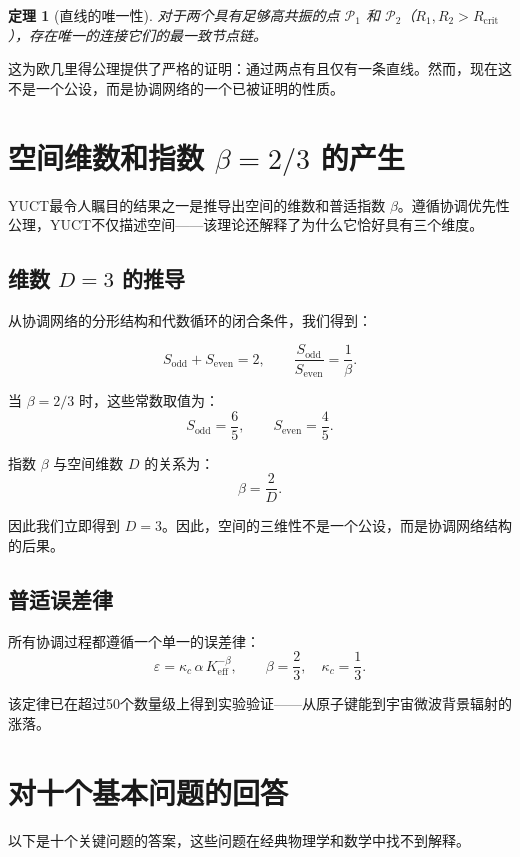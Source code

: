 \documentclass[12pt,a4paper]{article}
\newtheorem{theorem}{定理}
\newcommand{\Keff}{K_{\mathrm{eff}}}
\newcommand{\kappac}{\kappa_c}
\newcommand{\eps}{\varepsilon}
\newcommand{\betaf}{\beta}
\newcommand{\Sodd}{S_{\mathrm{odd}}}
\newcommand{\Seven}{S_{\mathrm{even}}}
\newcommand{\Rcrit}{R_{\mathrm{crit}}}
\newcommand{\calP}{\mathcal{P}}
\begin{document}
	\begin{theorem}[直线的唯一性]
		对于两个具有足够高共振的点 \(\calP_1\) 和 \(\calP_2\)（\(R_1, R_2 > \Rcrit\)），存在唯一的连接它们的最一致节点链。
	\end{theorem}
	
	这为欧几里得公理提供了严格的证明：通过两点有且仅有一条直线。然而，现在这不是一个公设，而是协调网络的一个已被证明的性质。
	
	\section{空间维数和指数 \(\betaf = 2/3\) 的产生}
	
	YUCT最令人瞩目的结果之一是推导出空间的维数和普适指数 \(\betaf\)。遵循协调优先性公理，YUCT不仅描述空间——该理论还解释了为什么它恰好具有三个维度。
	
	\subsection{维数 \(D=3\) 的推导}
	
	从协调网络的分形结构和代数循环的闭合条件，我们得到：
	
	\[
	\Sodd + \Seven = 2, \qquad \frac{\Sodd}{\Seven} = \frac{1}{\betaf}.
	\]
	
	当 \(\betaf = 2/3\) 时，这些常数取值为：
	\[
	\Sodd = \frac{6}{5}, \qquad \Seven = \frac{4}{5}.
	\]
	
	指数 \(\betaf\) 与空间维数 \(D\) 的关系为：
	\[
	\betaf = \frac{2}{D}.
	\]
	
	因此我们立即得到 \(D = 3\)。因此，空间的三维性不是一个公设，而是协调网络结构的后果。
	
	\subsection{普适误差律}
	
	所有协调过程都遵循一个单一的误差律：
	\[
	\eps = \kappac\,\alpha\,\Keff^{-\betaf}, \qquad \betaf = \frac{2}{3}, \quad \kappac = \frac{1}{3}.
	\]
	
	该定律已在超过50个数量级上得到实验验证——从原子键能到宇宙微波背景辐射的涨落。
	
	\section{对十个基本问题的回答}
	
	以下是十个关键问题的答案，这些问题在经典物理学和数学中找不到解释。
	
\end{document}
